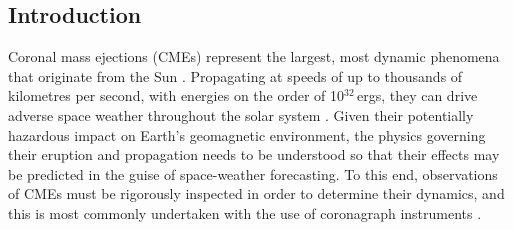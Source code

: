 \documentclass[referee,a4paper,12pt,traditabstract]{swsc}
\begin{document}
\begin{linenumbers}
    


   \maketitle

\section{Introduction}

Coronal mass ejections (CMEs) represent the largest, most dynamic phenomena that originate from the Sun \citep{2011LRSP....8....1C,2012LRSP....9....3W}. Propagating at speeds of up to thousands of kilometres per second, with energies on the order of 10$^{32}$\,ergs, they can drive adverse space weather throughout the solar system \citep{2005A&A...440..373H,2007LRSP....4....1P}. Given their potentially hazardous impact on Earth's geomagnetic environment, the physics governing their eruption and propagation needs to be understood so that their effects may be predicted in the guise of space-weather forecasting. To this end, observations of CMEs must be rigorously inspected in order to determine their dynamics, and this is most commonly undertaken with the use of coronagraph instruments \citep[e.g.,][]{1975Koomen,1980ApJ...237L..99S,1980SoPh...65...91M,1985JGR....90..275I,1993JGR....9813177H, 1995SoPh..162..357B, 2008SSRv..136...67H}. 


\end{linenumbers}
\end{document}
